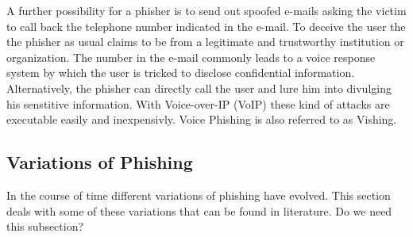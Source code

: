 \begin{description}[leftmargin=0cm]
	\item[Voice Phishing] A further possibility for a phisher is to send out spoofed e-mails asking the victim to call back the telephone number indicated in the e-mail. To deceive the user the the phisher as usual claims to be from a legitimate and trustworthy institution or organization. The number in the e-mail commonly leads to a voice response system by which the user is tricked to disclose confidential information. Alternatively, the phisher can directly call the user and lure him into divulging his senstitive information. With Voice-over-IP (VoIP) these kind of attacks are executable easily and inexpensivly. Voice Phishing is also referred to as Vishing.
\end{description}

\subsection{Variations of Phishing}
In the course of time different variations of phishing have evolved. This section deals with some of these variations that can be found in literature.
\label{s:phishing_variations}
Do we need this subsection?
